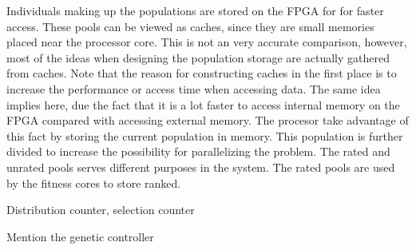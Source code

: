 Individuals making up the populations are stored on the FPGA for for faster access. 
These pools can be viewed as caches, since they are small memories placed near the processor core. This is not an very accurate comparison, however, most of the ideas when designing the population storage are actually gathered from caches. Note that the reason for constructing caches in the first place is to increase the performance or access time when accessing data. The same idea implies here, due the fact that it is a lot faster to access internal memory on the FPGA compared with accessing external memory. The procesor take advantage of this fact by storing the current population in memory. This population is further divided to increase the possibility for parallelizing the problem. The rated and unrated pools serves different purposes in the system. The rated pools are used by the fitness cores to store ranked. 


Distribution counter, selection counter


Mention the genetic controller 



